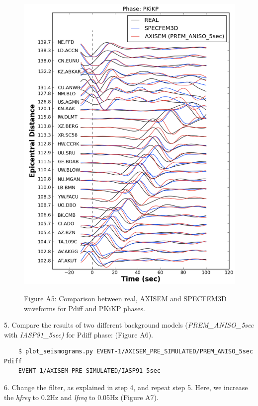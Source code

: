 \documentclass{article}
\begin{document}
\begin{figure}
\begin{minipage}{.5\textwidth}
  \includegraphics[width=1.\linewidth]{AXISEMTutorial-fig011.pdf}
\end{minipage}
\begin{center}
{\small{}Figure A5: Comparison between real, AXISEM and SPECFEM3D waveforms for 
Pdiff and PKiKP phases.}
\end{center}
\end{figure}

5. Compare the results of two different background models (\textit{PREM\_ANISO\_5sec} with 
\textit{IASP91\_5sec)} for Pdiff phase: (Figure A6).

\begin{verbatim}
    $ plot_seismograms.py EVENT-1/AXISEM_PRE_SIMULATED/PREM_ANISO_5sec Pdiff 
    EVENT-1/AXISEM_PRE_SIMULATED/IASP91_5sec
\end{verbatim}

6. Change the filter, as explained in step 4, and repeat step 5. Here, we increase 
the \textit{hfreq} to 0.2Hz and \textit{lfreq} to 0.05Hz (Figure A7).
\end{document}
